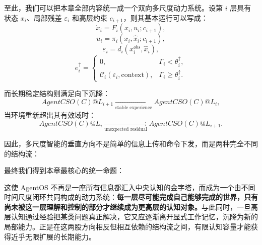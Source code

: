 至此，我们可以把本章全部内容统一成一个双向多尺度动力系统。设第 $i$ 层具有状态 $x_i$、局部残差 $\varepsilon_i$ 和高层约束 $c_{i+1}$，则其基本运行可以写成：
\begin{equation}
\dot{x}_i
=
F_i(x_i,u_i;c_{i+1}),
\end{equation}
\begin{equation}
u_i
=
\pi_i(x_i,\hat{x}_i;c_{i+1}),
\end{equation}
\begin{equation}
\varepsilon_i
=
d_i(x_i^{obs},\hat{x}_i),
\end{equation}
\begin{equation}
e_i^\uparrow
=
\begin{cases}
0,
&
\Gamma_i<\theta_i^\uparrow,\\
\mathcal C_i(\varepsilon_i,\text{context}),
&
\Gamma_i\geq\theta_i^\uparrow.
\end{cases}
\end{equation}

而长期稳定结构则满足向下沉降：
\begin{equation}
AgentCSO(C)@L_{i+1}
\xrightarrow[\text{stable experience}]{}
AgentCSO(C)@L_i,
\end{equation}
当环境重新超出其有效域时：
\begin{equation}
AgentCSO(C)@L_i
\xrightarrow[\text{unexpected residual}]{}
AgentCSO(C)@L_{i+1}.
\end{equation}

因此，多尺度智能的垂直方向不是简单的信息上传和命令下发，而是两种完全不同的结构流：
\begin{statementbox}
\centering
{}
\end{statementbox}

最终我们得到本章最核心的统一命题：
\begin{statementbox}
\centering
{}
\end{statementbox}

这使 AgentOS 不再是一座所有信息都汇入中央认知的金字塔，而成为一个由不同时间尺度闭环共同构成的动力系统：\textbf{每一层尽可能完成自己能够完成的世界，只有尚未被这一层理解和控制的部分才继续成为更高层的认知对象。}与此同时，一旦高层认知通过经验把某类问题真正解决，它又应逐渐离开显式工作记忆，沉降为新的局部能力。正是在这两股方向相反但相互依赖的结构流之间，有限认知容量才能获得近乎无限扩展的长期能力。
